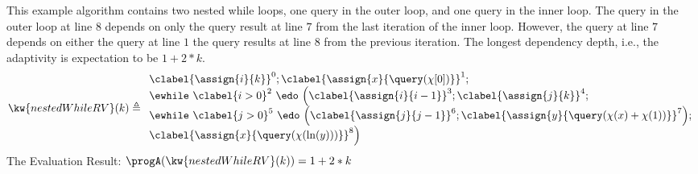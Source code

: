     \begin{example}
        \label{ex:nestedWhileRV}
        This example algorithm contains two nested while loops, one query in the outer loop, and one query in the inner loop.
        The query in the outer loop at line $8$ depends on only the query result at line $7$
        from the last iteration of the inner loop.
        However, the query at line $7$ depends on  either the query at line $1$ 
        the query results at line $8$ from the previous iteration.
        The longest dependency depth, i.e., the adaptivity is expectation to be $1 + 2 * k $.
        \[
            \kw{nestedWhileRV}(k) \triangleq 
        \begin{array}{l}
            \clabel{ \assign{i}{k} }^{0} ; 
            \clabel{\assign{x}{\query(\chi[0])}}^{1} ; \\
   \ewhile ~ \clabel{i > 0}^{2} ~ \edo ~ 
   \Big(
    \clabel{\assign{i}{i-1}}^{3} ;
    \clabel{\assign{j}{k}}^{4} ;\\
    \ewhile ~ \clabel{j > 0}^{5} ~ \edo ~ 
    \Big(
     \clabel{\assign{j}{j-1}}^{6};
     \clabel{\assign{y}{\query(\chi(x) + \chi(1))} }^{7}
     \Big); \\
    \clabel{\assign{x}{\query(\chi(\ln(y)))} }^{8}
     \Big)
            \end{array}
        \]
        The Evaluation Result: $ \progA(\kw{nestedWhileRV}(k)) = 1 + 2 * k $
    \end{example}
%
   
